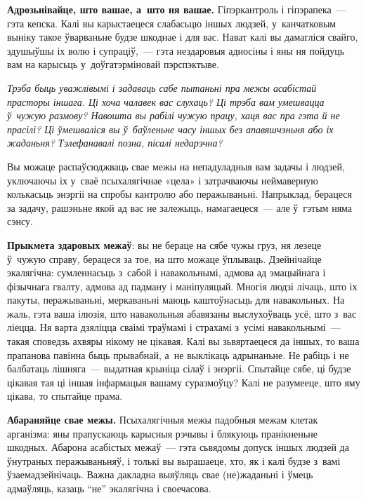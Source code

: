 \textbf{Адрозьнівайце, што вашае, а~што ня вашае.} Гіпэркантроль і гіпэрапека~--- гэта кепска. Калі вы карыстаецеся слабасьцю іншых людзей, у~канчатковым выніку такое ўварваньне будзе шкоднае і для вас. Нават калі вы дамагліся свайго, здушыўшы іх волю і супраціў,~--- гэта нездаровыя адносіны і яны ня пойдуць вам на карысьць у~доўгатэрміновай пэрспэктыве.

\emph{Трэба быць уважлівымі і задаваць сабе пытаньні пра межы асабістай прасторы іншага. Ці хоча чалавек вас слухаць? Ці трэба вам умешвацца ў~чужую размову? Навошта вы рабілі чужую працу, хаця вас пра гэта й не прасілі? Ці ўмешваліся вы ў~баўленьне часу іншых без апавяшчэньня або іх жаданьня? Тэлефанавалі позна, пісалі недарэчна?}

Вы можаце распаўсюджваць свае межы на непадуладныя вам задачы і людзей, уключаючы іх у~сваё псыхалягічнае «цела» і затрачваючы неймаверную колькасьць энэргіі на спробы кантролю або перажываньні. Напрыклад, берацеся за задачу, рашэньне якой ад вас не залежыць, намагаецеся~--- але ў~гэтым няма сэнсу. 

\textbf{Прыкмета здаровых межаў}: вы не бераце на сябе чужы груз, ня лезеце ў~чужую справу, берацеся за тое, на што можаце ўплываць. Дзейнічайце экалягічна: сумленнасьць з~сабой і навакольнымі, адмова ад эмацыйнага і фізычнага гвалту, адмова ад падману і маніпуляцый. Многія людзі лічаць, што іх пакуты, перажываньні, меркаваньні маюць каштоўнасьць для навакольных. На жаль, гэта ваша ілюзія, што навакольныя абавязаны выслухоўваць усё, што з~вас ліецца. Ня варта дзяліцца сваімі траўмамі і страхамі з~усімі навакольнымі~--- такая споведзь ахвяры нікому не цікавая. Калі вы зьвяртаецеся да іншых, то ваша прапанова павінна быць прывабнай, а~не выклікаць адрынаньне. Не рабіць і не балбатаць лішняга~--- выдатная крыніца сілаў і энэргіі. Спытайце сябе, ці будзе цікавая тая ці іншая інфармацыя вашаму суразмоўцу? Калі не разумееце, што яму цікава, то спытайце прама.

\textbf{Абараняйце свае межы.} Псыхалягічныя межы падобныя межам клетак арганізма: яны прапускаюць карысныя рэчывы і блякуюць пранікненьне шкодных. Абарона асабістых межаў~--- гэта сьвядомы допуск іншых людзей да ўнутраных перажываньняў, і толькі вы вырашаеце, хто, як і калі будзе з~вамі ўзаемадзейнічаць. Важна дакладна выяўляць свае (не)жаданьні і ўмець адмаўляць, казаць ``не'' экалягічна і своечасова.


